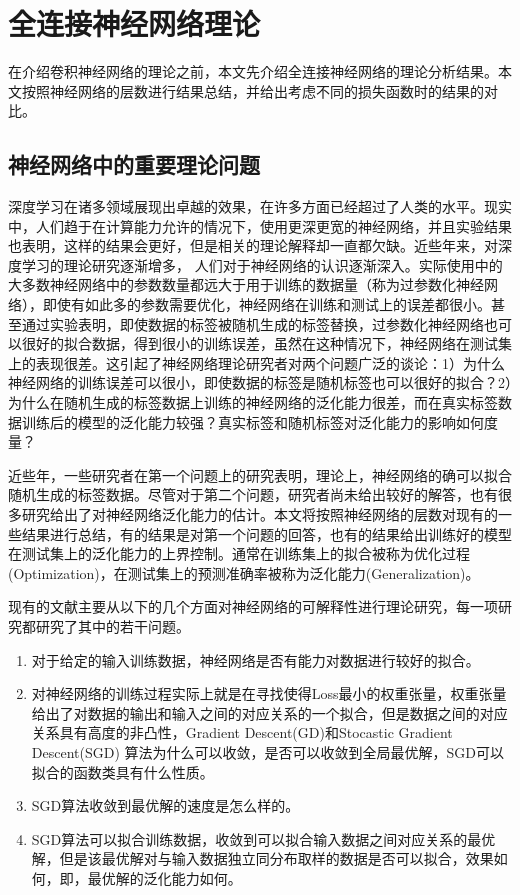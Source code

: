 \chapter{全连接神经网络理论}
在介绍卷积神经网络的理论之前，本文先介绍全连接神经网络的理论分析结果。本文按照神经网络的层数进行结果总结，并给出考虑不同的损失函数时的结果的对比。

\section{神经网络中的重要理论问题}
深度学习在诸多领域展现出卓越的效果，在许多方面已经超过了人类的水平。现实中，人们趋于在计算能力允许的情况下，使用更深更宽的神经网络，并且实验结果也表明，这样的结果会更好，但是相关的理论解释却一直都欠缺。近些年来，对深度学习的理论研究逐渐增多，	人们对于神经网络的认识逐渐深入。实际使用中的大多数神经网络中的参数数量都远大于用于训练的数据量（称为过参数化神经网络），即使有如此多的参数需要优化，神经网络在训练和测试上的误差都很小。甚至\citet{zhang2016understanding}通过实验表明，即使数据的标签被随机生成的标签替换，过参数化神经网络也可以很好的拟合数据，得到很小的训练误差，虽然在这种情况下，神经网络在测试集上的表现很差。这引起了神经网络理论研究者对两个问题广泛的谈论：1）为什么神经网络的训练误差可以很小，即使数据的标签是随机标签也可以很好的拟合？2）为什么在随机生成的标签数据上训练的神经网络的泛化能力很差，而在真实标签数据训练后的模型的泛化能力较强？真实标签和随机标签对泛化能力的影响如何度量？
\par
近些年，一些研究者在第一个问题上的研究表明，理论上，神经网络的确可以拟合随机生成的标签数据\cite{du2018gradient,allen2018convergence,du2018gradient2,zou2018stochastic}。尽管对于第二个问题，研究者尚未给出较好的解答，也有很多研究给出了对神经网络泛化能力的估计。本文将按照神经网络的层数对现有的一些结果进行总结，有的结果是对第一个问题的回答，也有的结果给出训练好的模型在测试集上的泛化能力的上界控制。通常在训练集上的拟合被称为优化过程(Optimization)，在测试集上的预测准确率被称为泛化能力(Generalization)。
\par
现有的文献主要从以下的几个方面对神经网络的可解释性进行理论研究，每一项研究都研究了其中的若干问题。
\begin{enumerate}
  \item 对于给定的输入训练数据，神经网络是否有能力对数据进行较好的拟合。
  \item 对神经网络的训练过程实际上就是在寻找使得Loss最小的权重张量，权重张量给出了对数据的输出和输入之间的对应关系的一个拟合，但是数据之间的对应关系具有高度的非凸性，Gradient Descent(GD)和Stocastic Gradient Descent(SGD) 算法为什么可以收敛，是否可以收敛到全局最优解，SGD可以拟合的函数类具有什么性质。
  \item SGD算法收敛到最优解的速度是怎么样的。
  \item SGD算法可以拟合训练数据，收敛到可以拟合输入数据之间对应关系的最优解，但是该最优解对与输入数据独立同分布取样的数据是否可以拟合，效果如何，即，最优解的泛化能力如何。
\end{enumerate}
